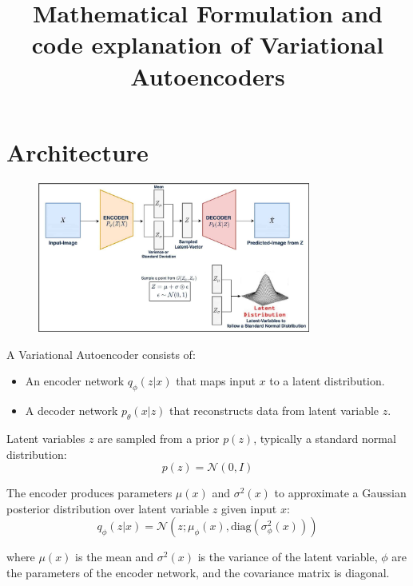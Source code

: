 \documentclass{article}
\title{Mathematical Formulation and code explanation of Variational Autoencoders}
\begin{document}
\maketitle

\section{Architecture}

\begin{figure}[H]
    \centering
    \includegraphics[width=0.8\textwidth]{arch.jpg}
\end{figure}

A Variational Autoencoder consists of:
\begin{itemize}
    \item An encoder network $q_{\phi}(z|x)$ that maps input $x$ to a latent distribution.
    \item A decoder network $p_{\theta}(x|z)$ that reconstructs data from latent variable $z$.
\end{itemize}

Latent variables $z$ are sampled from a prior $p(z)$, typically a standard normal distribution:
\[
p(z) = \mathcal{N}(0, I)
\]

The encoder produces parameters $\mu(x)$ and $\sigma^2(x)$ to approximate a Gaussian posterior distribution over latent variable $z$ given input $x$:
\[
q_{\phi}(z|x) = \mathcal{N}(z; \mu_{\phi}(x), \mathrm{diag}(\sigma^2_{\phi}(x)))
\]

where $\mu(x)$ is the mean and $\sigma^2(x)$ is the variance of the latent variable, $\phi$ are the parameters of the encoder network, and the covariance matrix is diagonal.


\end{document}
